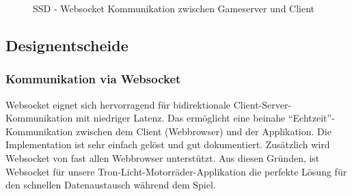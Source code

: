 \documentclass[11pt,ngerman]{article}
\newcommand{\quotes}[1]{``#1''}
\begin{document}
    \begin{figure}[H]
        \centering
        \caption{SSD - \Gls{Websocket} Kommunikation zwischen Gameserver und Client}
        \label{fig:SSDWS_GS_Client}
    \end{figure}

    \subsection{Designentscheide}

    \subsubsection{Kommunikation via Websocket}
    \Gls{Websocket} eignet  sich hervorragend für bidirektionale Client-Server-Kommunikation mit niedriger Latenz. Das ermöglicht eine beinahe  \quotes{Echtzeit}-Kommunikation zwischen dem Client (\Gls{Webbrowser}) und der Applikation. Die Implementation ist sehr einfach gelöst und gut dokumentiert. Zusätzlich wird \Gls{Websocket} von fast allen \Gls{Webbrowser} unterstützt. Aus diesen Gründen, ist \Gls{Websocket} für unsere Tron-Licht-Motorräder-Applikation die perfekte Lösung für den schnellen Datenaustausch während dem Spiel.
\end{document}
